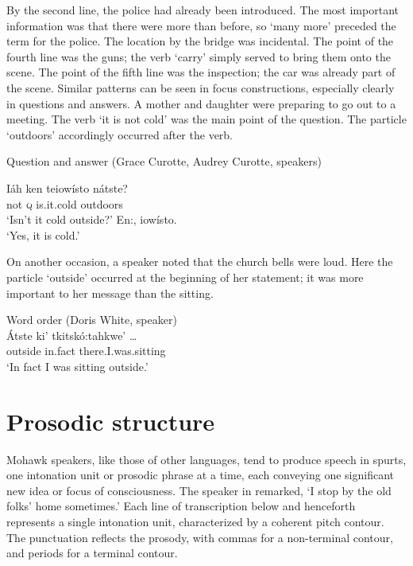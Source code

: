 \documentclass[output=paper,colorlinks,citecolor=brown]{langscibook}
\begin{document}
By the second line, the police had already been introduced. The most important information was that there were more than before, so `many more' preceded the term for the police. The location by the bridge was incidental. The point of the fourth line was the guns; the verb `carry' simply served to bring them onto the scene. The point of the fifth line was the inspection; the car was already part of the scene.
Similar patterns can be seen in focus constructions, especially clearly in questions and answers. A mother and daughter were preparing to go out to a meeting. The verb `it is not cold' was the main point of the question. The particle `outdoors' accordingly occurred after the verb.

\ea Question and answer (Grace Curotte, Audrey Curotte, speakers)\\\label{ex:mithun:4}
\begin{xlist}[MM]
\gll Iáh ken teiowísto nátste?\\
     not \textsc{q} {is.it.cold} outdoors\\
\glt `Isn't it cold outside?'
 En:, iowísto.\\
\glt `Yes, it is cold.'
\end{xlist}
\z

On another occasion, a speaker noted that the church bells were loud. Here the particle `outside' occurred at the beginning of her statement; it was more important to her message than the sitting.

\ea\label{ex:mithun:6} Word order (Doris White, speaker)\\
\gll Átste ki' tkitskó:tahkwe'  \ldots \\
     outside  {in.fact}  {there.I.was.sitting}\\
\glt `In fact I was sitting outside.'
\z

\section{Prosodic structure}
\begin{sloppypar}
Mohawk speakers, like those of other languages, tend to produce speech in spurts, one intonation unit or prosodic phrase at a time, each conveying one significant new idea or focus of consciousness. The speaker in  remarked, `I stop by the old folks' home sometimes.' Each line of transcription below and henceforth represents a single intonation unit, characterized by a coherent pitch contour. The punctuation reflects the prosody, with commas for a non-terminal contour, and periods for a terminal contour.
\end{sloppypar}
\end{document}
